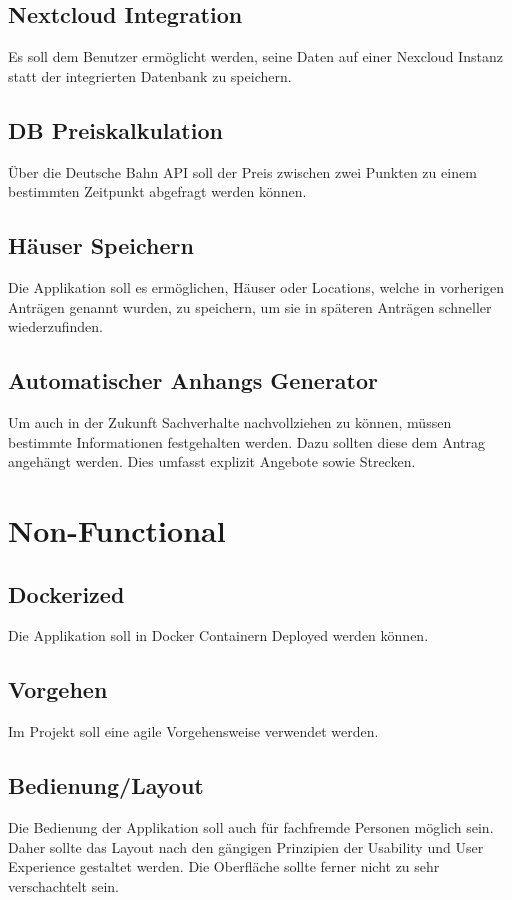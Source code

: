 \subsection{Nextcloud Integration}\label{subsec:nextcloud-integration}
Es soll dem Benutzer ermöglicht werden, seine Daten auf einer Nexcloud Instanz statt der integrierten Datenbank zu speichern.
\subsection{DB Preiskalkulation}\label{subsec:db-preiskalkulation}
Über die Deutsche Bahn \ac{API} soll der Preis zwischen zwei Punkten zu einem bestimmten Zeitpunkt abgefragt werden können.
\subsection{Häuser Speichern}\label{subsec:hauser-speichern}
Die Applikation soll es ermöglichen, Häuser oder Locations, welche in vorherigen Anträgen genannt wurden, zu speichern,
um sie in späteren Anträgen schneller wiederzufinden.
\subsection{Automatischer Anhangs Generator}\label{subsec:automatischer-anhangs-generator}
Um auch in der Zukunft Sachverhalte nachvollziehen zu können, müssen bestimmte Informationen festgehalten werden.
Dazu sollten diese dem Antrag angehängt werden.
Dies umfasst explizit Angebote sowie Strecken.

\section{Non-Functional}\label{sec:non-functional}
\subsection{Dockerized}\label{subsec:dockerized}
Die Applikation soll in Docker Containern Deployed werden können.
\subsection{Vorgehen}\label{subsec:vorgehen}
Im Projekt soll eine agile Vorgehensweise verwendet werden.
\subsection{Bedienung/Layout}\label{subsec:bedienung/layout}
Die Bedienung der Applikation soll auch für fachfremde Personen möglich sein.
Daher sollte das Layout nach den gängigen Prinzipien der Usability und User Experience gestaltet werden.
Die Oberfläche sollte ferner nicht zu sehr verschachtelt sein.
